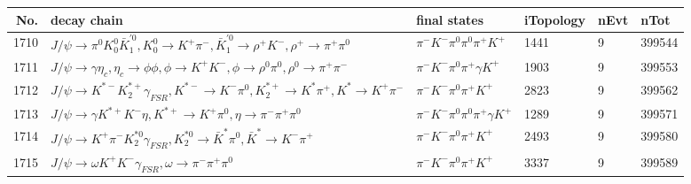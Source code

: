\begin{table}[htbp] 
\begin{center}
\begin{small}
\begin{tabular}{rlllll}\hline\hline
 No. & decay chain & final states &  iTopology & nEvt & nTot \\\hline
1710&$J/\psi       \rightarrow \pi^{0}        K_0^{0}        \bar{K}_1^{'0}, K_0^{0}         \rightarrow K^{+}          \pi^{-}        , \bar{K}_1^{'0} \rightarrow \rho^{+}      K^{-}          , \rho^{+}       \rightarrow \pi^{+}        \pi^{0}        $&$\pi^{-}        K^{-}          \pi^{0}        \pi^{0}        \pi^{+}        K^{+}          $& 1441&    9&399544\\
1711&$J/\psi       \rightarrow \gamma       \eta_{c}    , \eta_{c}     \rightarrow \phi           \phi           , \phi            \rightarrow K^{+}          K^{-}          , \phi            \rightarrow \rho^{0}      \pi^{0}        , \rho^{0}       \rightarrow \pi^{+}        \pi^{-}        $&$\pi^{-}        K^{-}          \pi^{0}        \pi^{+}        \gamma       K^{+}          $& 1903&    9&399553\\
1712&$J/\psi       \rightarrow K^{*-}         K_2^{*+}       \gamma_{FSR} , K^{*-}          \rightarrow K^{-}          \pi^{0}        , K_2^{*+}        \rightarrow K^{*}          \pi^{+}        , K^{*}           \rightarrow K^{+}          \pi^{-}        $&$\pi^{-}        K^{-}          \pi^{0}        \pi^{+}        K^{+}          $& 2823&    9&399562\\
1713&$J/\psi       \rightarrow \gamma       K^{*+}         K^{-}          \eta          , K^{*+}          \rightarrow K^{+}          \pi^{0}        , \eta           \rightarrow \pi^{-}        \pi^{+}        \pi^{0}        $&$\pi^{-}        K^{-}          \pi^{0}        \pi^{0}        \pi^{+}        \gamma       K^{+}          $& 1289&    9&399571\\
1714&$J/\psi       \rightarrow K^{+}          \pi^{-}        K_2^{*0}       \gamma_{FSR} , K_2^{*0}        \rightarrow \bar{K}^{*}   \pi^{0}        , \bar{K}^{*}    \rightarrow K^{-}          \pi^{+}        $&$\pi^{-}        K^{-}          \pi^{0}        \pi^{+}        K^{+}          $& 2493&    9&399580\\
1715&$J/\psi       \rightarrow \omega         K^{+}          K^{-}          \gamma_{FSR} , \omega          \rightarrow \pi^{-}        \pi^{+}        \pi^{0}        $&$\pi^{-}        K^{-}          \pi^{0}        \pi^{+}        K^{+}          $& 3337&    9&399589\\

\end{tabular}
\end{small}
\end{center}
\end{table}
